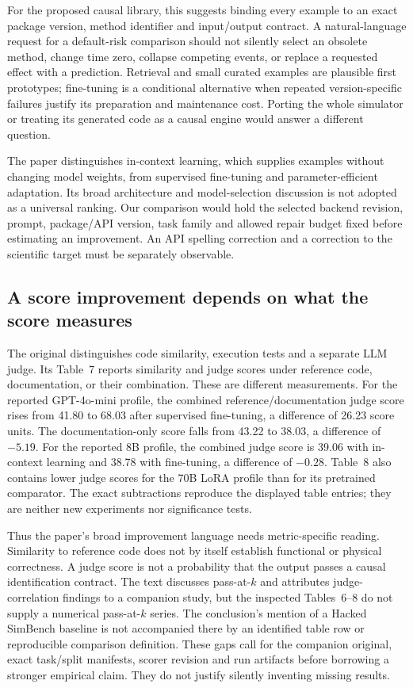 For the proposed causal library, this suggests binding every example to an
exact package version, method identifier and input/output contract. A
natural-language request for a default-risk comparison should not silently
select an obsolete method, change time zero, collapse competing events, or
replace a requested effect with a prediction. Retrieval and small curated
examples are plausible first prototypes; fine-tuning is a conditional
alternative when repeated version-specific failures justify its preparation
and maintenance cost. Porting the whole simulator or treating its generated
code as a causal engine would answer a different question.

The paper distinguishes in-context learning, which supplies examples without
changing model weights, from supervised fine-tuning and parameter-efficient
adaptation. Its broad architecture and model-selection discussion is not
adopted as a universal ranking. Our comparison would hold the selected
backend revision, prompt, package/API version, task family and allowed repair
budget fixed before estimating an improvement. An API spelling correction
and a correction to the scientific target must be separately observable.
\citep{exec24_chronollm_original}

\subsection{A score improvement depends on what the score measures}
The original distinguishes code similarity, execution tests and a separate
LLM judge. Its Table~7 reports similarity and judge scores under reference
code, documentation, or their combination. These are different measurements.
For the reported GPT-4o-mini profile, the combined reference/documentation
judge score rises from 41.80 to 68.03 after supervised fine-tuning, a difference
of 26.23 score units. The documentation-only score falls from 43.22 to 38.03,
a difference of $-5.19$. For the reported 8B profile, the combined judge score
is 39.06 with in-context learning and 38.78 with fine-tuning, a difference
of $-0.28$. Table~8 also contains lower judge scores for the 70B LoRA profile
than for its pretrained comparator. The exact subtractions reproduce the
displayed table entries; they are neither new experiments nor significance
tests.~\citep{exec24_chronollm_original,exec24_chronollm_reference}

Thus the paper's broad improvement language needs metric-specific reading.
Similarity to reference code does not by itself establish functional or
physical correctness. A judge score is not a probability that the output
passes a causal identification contract. The text discusses pass-at-$k$ and
attributes judge-correlation findings to a companion study, but the inspected
Tables~6--8 do not supply a numerical pass-at-$k$ series. The conclusion's
mention of a Hacked SimBench baseline is not accompanied there by an
identified table row or reproducible comparison definition. These gaps call
for the companion original, exact task/split manifests, scorer revision and
run artifacts before borrowing a stronger empirical claim. They do not
justify silently inventing missing results.~\citep{exec24_chronollm_original}


